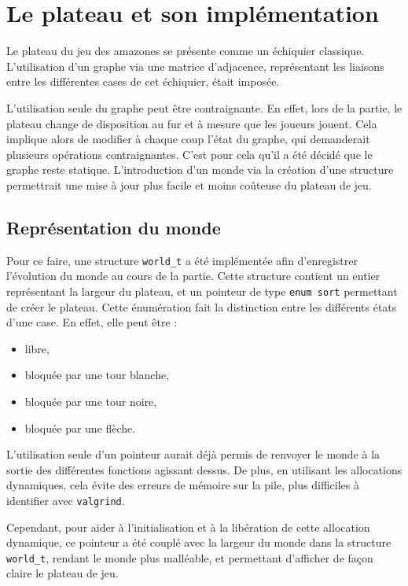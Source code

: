 \chapter{Le plateau et son implémentation}
\label{chap:plateau}

Le plateau du jeu des amazones se présente comme un échiquier classique. L'utilisation d'un graphe via une matrice d'adjacence, représentant les liaisons entre les différentes cases de cet échiquier, était imposée. 

L'utilisation seule du graphe peut être contraignante. En effet, lors de la partie, le plateau change de disposition au fur et à mesure que les joueurs jouent. Cela implique alors de modifier à chaque coup l'état du graphe, qui demanderait plusieurs opérations contraignantes. C'est pour cela qu'il a été décidé que le graphe reste statique. L'introduction d'un monde via la création d'une structure permettrait une mise à jour plus facile et moins coûteuse du plateau de jeu.  

\section{Représentation du monde}
\label{sec:repr_monde}

Pour ce faire, une structure \texttt{world\_t} a été implémentée afin d'enregistrer l'évolution du monde au cours de la partie. Cette structure contient un entier représentant la largeur du plateau, et un pointeur de type \texttt{enum sort} permettant de créer le plateau. Cette énumération fait la distinction entre les différents états d'une case. En effet, elle peut être :

\begin{itemize}
    \item libre,
    \item bloquée par une tour blanche,
    \item bloquée par une tour noire,
    \item bloquée par une flèche.
\end{itemize}

\bigbreak

L'utilisation seule d'un pointeur aurait déjà permis de renvoyer le monde à la sortie des différentes fonctions agissant dessus. De plus, en utilisant les allocations dynamiques, cela évite des erreurs de mémoire sur la pile, plus difficiles à identifier avec \texttt{valgrind}.

Cependant, pour aider à l'initialisation et à la libération de cette allocation dynamique, ce pointeur a été couplé avec la largeur du monde dans la structure \texttt{world\_t}, rendant le monde plus malléable, et permettant d'afficher de façon claire le plateau de jeu.

